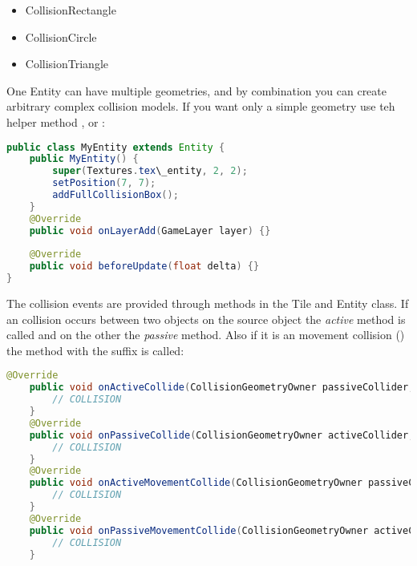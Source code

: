 \begin{itemize}
\item CollisionRectangle
\item CollisionCircle
\item CollisionTriangle
\end{itemize}

One Entity can have multiple geometries, and by combination you can create arbitrary complex collision models.
If you want only a simple geometry use teh helper method ,  or :

\doinline
\begin{lstlisting}[caption=Markdown Tutorial: fenced code block, title=\hspace{0 pt}, language=java]
public class MyEntity extends Entity {
	public MyEntity() {
		super(Textures.tex\_entity, 2, 2);
		setPosition(7, 7);
		addFullCollisionBox();
	}
	@Override
	public void onLayerAdd(GameLayer layer) {}
	
	@Override
	public void beforeUpdate(float delta) {}
}
\end{lstlisting}

The collision events are provided through methods in the Tile and Entity class. If an collision occurs between two objects on the source object the \textit{active} method is called and on the other the \textit{passive} method. Also if it is an movement collision () the method with the suffix  is called:

\doinline
\begin{lstlisting}[caption=Markdown Tutorial: fenced code block, title=\hspace{0 pt}, language=java]
	@Override
	public void onActiveCollide(CollisionGeometryOwner passiveCollider, CollisionGeometry myGeo, CollisionGeometry otherGeo) {
		// COLLISION
	}
	@Override
	public void onPassiveCollide(CollisionGeometryOwner activeCollider, CollisionGeometry myGeo, CollisionGeometry otherGeo) {
		// COLLISION
	}
	@Override
	public void onActiveMovementCollide(CollisionGeometryOwner passiveCollider, CollisionGeometry myGeo, CollisionGeometry otherGeo) {
		// COLLISION
	}
	@Override
	public void onPassiveMovementCollide(CollisionGeometryOwner activeCollider, CollisionGeometry myGeo, CollisionGeometry otherGeo) {
		// COLLISION
	}
\end{lstlisting}

